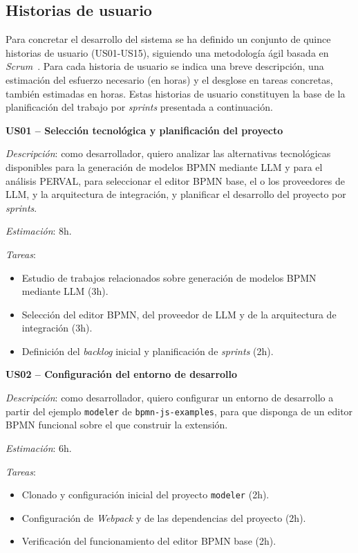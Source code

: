 {%
\subsection{Historias de usuario}
\label{subsec:historiasUsuario}

Para concretar el desarrollo del sistema se ha definido un conjunto de quince historias de usuario (US01-US15), siguiendo una metodología ágil basada en \textit{Scrum}~\cite{riano2021}. Para cada historia de usuario se indica una breve descripción, una estimación del esfuerzo necesario (en horas) y el desglose en tareas concretas, también estimadas en horas. Estas historias de usuario constituyen la base de la planificación del trabajo por \textit{sprints} presentada a continuación.

\textbf{US01 -- Selección tecnológica y planificación del proyecto}

\textit{Descripción}: como desarrollador, quiero analizar las alternativas tecnológicas disponibles para la generación de modelos BPMN mediante LLM y para el análisis PERVAL, para seleccionar el editor BPMN base, el o los proveedores de LLM, y la arquitectura de integración, y planificar el desarrollo del proyecto por \textit{sprints}.

\textit{Estimación}: 8h.

\textit{Tareas}:
\begin{itemize}
    \item Estudio de trabajos relacionados sobre generación de modelos BPMN mediante LLM (3h).
    \item Selección del editor BPMN, del proveedor de LLM y de la arquitectura de integración (3h).
    \item Definición del \textit{backlog} inicial y planificación de \textit{sprints} (2h).
\end{itemize}

\textbf{US02 -- Configuración del entorno de desarrollo}

\textit{Descripción}: como desarrollador, quiero configurar un entorno de desarrollo a partir del ejemplo \texttt{modeler} de \texttt{bpmn-js-examples}, para que disponga de un editor BPMN funcional sobre el que construir la extensión.

\textit{Estimación}: 6h.

\textit{Tareas}:
\begin{itemize}
    \item Clonado y configuración inicial del proyecto \texttt{modeler} (2h).
    \item Configuración de \textit{Webpack} y de las dependencias del proyecto (2h).
    \item Verificación del funcionamiento del editor BPMN base (2h).
\end{itemize}

}
